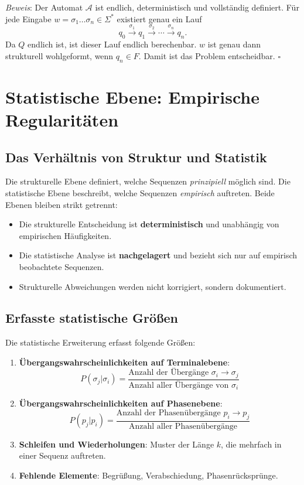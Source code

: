 \documentclass[
  12pt,
  a4paper,
  oneside,
  titlepage
]{article}
\begin{document}
\textit{Beweis}: Der Automat \(\mathcal{A}\) ist endlich, deterministisch 
und vollständig definiert. Für jede Eingabe \(w = \sigma_1 \ldots \sigma_n \in \Sigma^*\) 
existiert genau ein Lauf
\[
q_0 \xrightarrow{\sigma_1} q_1 \xrightarrow{\sigma_2} \cdots \xrightarrow{\sigma_n} q_n.
\]
Da \(Q\) endlich ist, ist dieser Lauf endlich berechenbar. 
\(w\) ist genau dann strukturell wohlgeformt, wenn \(q_n \in F\). 
Damit ist das Problem entscheidbar. \(\square\)

\section{Statistische Ebene: Empirische Regularitäten}

\subsection{Das Verhältnis von Struktur und Statistik}

Die strukturelle Ebene definiert, welche Sequenzen \textit{prinzipiell} 
möglich sind. Die statistische Ebene beschreibt, welche Sequenzen 
\textit{empirisch} auftreten. Beide Ebenen bleiben strikt getrennt:

\begin{itemize}
    \item Die strukturelle Entscheidung ist \textbf{deterministisch} und 
    unabhängig von empirischen Häufigkeiten.
    
    \item Die statistische Analyse ist \textbf{nachgelagert} und bezieht 
    sich nur auf empirisch beobachtete Sequenzen.
    
    \item Strukturelle Abweichungen werden nicht korrigiert, sondern 
    dokumentiert.
\end{itemize}

\subsection{Erfasste statistische Größen}

Die statistische Erweiterung erfasst folgende Größen:

\begin{enumerate}
    \item \textbf{Übergangswahrscheinlichkeiten auf Terminalebene}:
    \[
    P(\sigma_j | \sigma_i) = \frac{\text{Anzahl der Übergänge } \sigma_i \to \sigma_j}{\text{Anzahl aller Übergänge von } \sigma_i}
    \]
    
    \item \textbf{Übergangswahrscheinlichkeiten auf Phasenebene}:
    \[
    P(p_j | p_i) = \frac{\text{Anzahl der Phasenübergänge } p_i \to p_j}{\text{Anzahl aller Phasenübergänge}}
    \]
    
    \item \textbf{Schleifen und Wiederholungen}: Muster der Länge \(k\), 
    die mehrfach in einer Sequenz auftreten.
    
    \item \textbf{Fehlende Elemente}: Begrüßung, Verabschiedung, 
    Phasenrücksprünge.
\end{enumerate}
\end{document}
